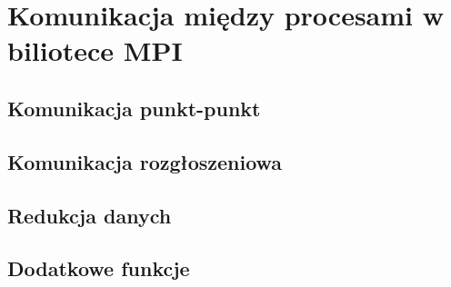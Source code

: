 \section{Komunikacja między procesami w biliotece MPI}

\subsection{Komunikacja punkt-punkt}

\subsection{Komunikacja rozgłoszeniowa}

\subsection{Redukcja danych}

\subsection{Dodatkowe funkcje}

